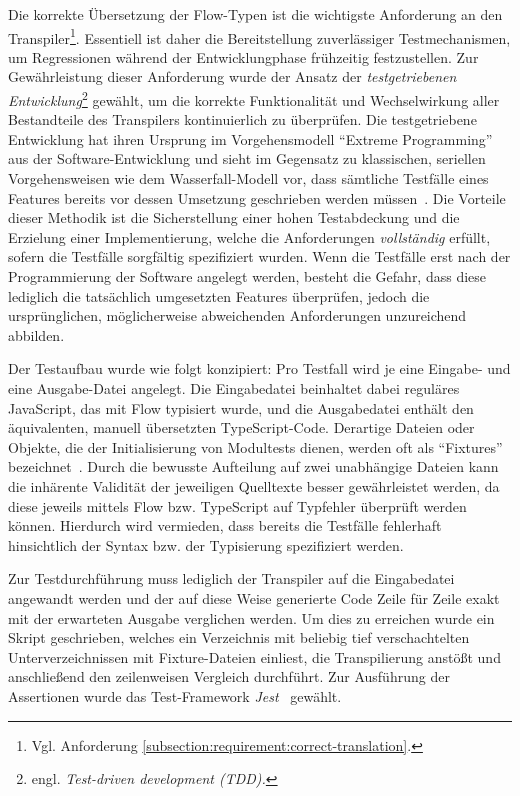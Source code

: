 Die korrekte Übersetzung der Flow-Typen ist die wichtigste Anforderung an den Transpiler\footnote{Vgl. Anforderung \ref{subsection:requirement:correct-translation}.}. Essentiell ist daher die Bereitstellung zuverlässiger Testmechanismen, um Regressionen während der Entwicklungphase frühzeitig festzustellen. Zur Gewährleistung dieser Anforderung wurde der Ansatz der \emph{testgetriebenen Entwicklung}\footnote{engl. \textit{Test-driven development (TDD).}} gewählt, um die korrekte Funktionalität und Wechselwirkung aller Bestandteile des Transpilers kontinuierlich zu überprüfen. Die testgetriebene Entwicklung hat ihren Ursprung im Vorgehensmodell \enquote{Extreme Programming}~\autocite{JEFFRIES:EXTREME_PROGRAMMING} aus der Software-Entwicklung und sieht im Gegensatz zu klassischen, seriellen Vorgehensweisen wie dem Wasserfall-Modell vor, dass sämtliche Testfälle eines Features bereits vor dessen Umsetzung geschrieben werden müssen~\autocite{KENT:EXTREME_PROGRAMMING}. Die Vorteile dieser Methodik ist die Sicherstellung einer hohen Testabdeckung und die Erzielung einer Implementierung, welche die Anforderungen \emph{vollständig} erfüllt, sofern die Testfälle sorgfältig spezifiziert wurden. Wenn die Testfälle erst nach der Programmierung der Software angelegt werden, besteht die Gefahr, dass diese lediglich die tatsächlich umgesetzten Features überprüfen, jedoch die ursprünglichen, möglicherweise abweichenden Anforderungen unzureichend abbilden.

Der Testaufbau wurde wie folgt konzipiert: Pro Testfall wird je eine Eingabe- und eine Ausgabe-Datei angelegt. Die Eingabedatei beinhaltet dabei reguläres JavaScript, das mit Flow typisiert wurde, und die Ausgabedatei enthält den äquivalenten, manuell übersetzten TypeScript-Code. Derartige Dateien oder Objekte, die der Initialisierung von Modultests dienen, werden oft als \enquote{Fixtures} bezeichnet~\autocite{OLAN:2003}. Durch die bewusste Aufteilung auf zwei unabhängige Dateien kann die inhärente Validität der jeweiligen Quelltexte besser gewährleistet werden, da diese jeweils mittels Flow bzw. TypeScript auf Typfehler überprüft werden können. Hierdurch wird vermieden, dass bereits die Testfälle fehlerhaft hinsichtlich der Syntax bzw. der Typisierung spezifiziert werden.

Zur Testdurchführung muss lediglich der Transpiler auf die Eingabedatei angewandt werden und der auf diese Weise generierte Code Zeile für Zeile exakt mit der erwarteten Ausgabe verglichen werden. Um dies zu erreichen wurde ein Skript geschrieben, welches ein Verzeichnis mit beliebig tief verschachtelten Unterverzeichnissen mit Fixture-Dateien einliest, die Transpilierung anstößt und anschließend den zeilenweisen Vergleich durchführt. Zur Ausführung der Assertionen wurde das Test-Framework \textit{Jest}~\autocite{SOFTWARE:JEST} gewählt.

